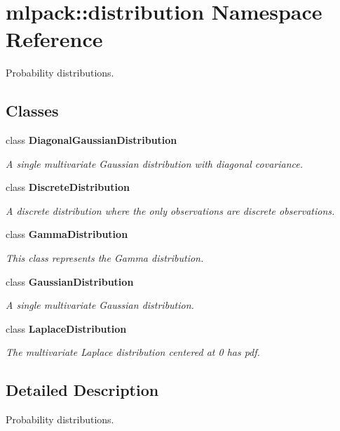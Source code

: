 \section{mlpack\+:\+:distribution Namespace Reference}
\label{namespacemlpack_1_1distribution}


Probability distributions.  


\subsection*{Classes}
\begin{DoxyCompactItemize}
\item 
class \textbf{ Diagonal\+Gaussian\+Distribution}
\begin{DoxyCompactList}\small\item\em A single multivariate Gaussian distribution with diagonal covariance. \end{DoxyCompactList}\item 
class \textbf{ Discrete\+Distribution}
\begin{DoxyCompactList}\small\item\em A discrete distribution where the only observations are discrete observations. \end{DoxyCompactList}\item 
class \textbf{ Gamma\+Distribution}
\begin{DoxyCompactList}\small\item\em This class represents the Gamma distribution. \end{DoxyCompactList}\item 
class \textbf{ Gaussian\+Distribution}
\begin{DoxyCompactList}\small\item\em A single multivariate Gaussian distribution. \end{DoxyCompactList}\item 
class \textbf{ Laplace\+Distribution}
\begin{DoxyCompactList}\small\item\em The multivariate Laplace distribution centered at 0 has pdf. \end{DoxyCompactList}\end{DoxyCompactItemize}


\subsection{Detailed Description}
Probability distributions. 


